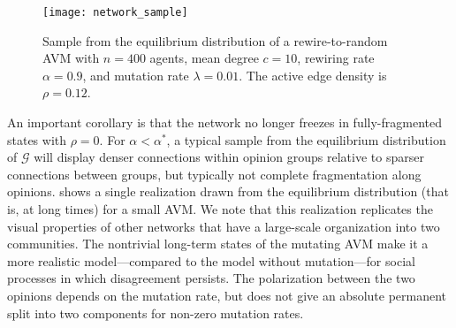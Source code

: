 \documentclass[review, onefignum, onetabnum]{siamart171218}
\begin{document}
	\begin{figure}
		\centering
		\texttt{[image: network\_sample]}
		\caption{Sample from the equilibrium distribution of a rewire-to-random AVM with $n = 400$ agents, mean degree $c = 10$, rewiring rate $\alpha = 0.9$, and mutation rate $\lambda = 0.01$. The active edge density is $\rho = 0.12$.} \label{fig:sample}
	\end{figure}
	
	An important corollary is that the network no longer freezes in fully-fragmented states with $\rho = 0$. 
	For $\alpha < \alpha^*$, a typical sample from the equilibrium distribution of $\mathcal{G}$ will display denser connections within opinion groups relative to sparser connections between groups, but typically not complete fragmentation along opinions. 
	 shows a single realization drawn from the equilibrium distribution (that is, at long times) for a small AVM. We note that this realization replicates the visual properties of other networks that have a large-scale organization into two communities. 
	The nontrivial long-term states of the mutating AVM make it a more realistic model---compared to the model without mutation---for social processes in which disagreement persists. The polarization between the two opinions depends on the mutation rate, but does not give an absolute permanent split into two components for non-zero mutation rates.

			
		
\end{document}
